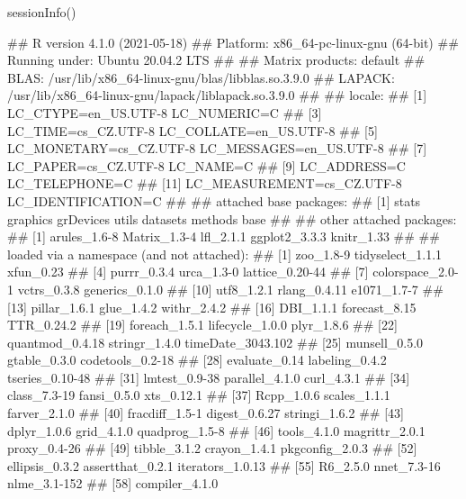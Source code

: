 \documentclass{article}\usepackage[]{graphicx}\usepackage[]{color}
\begin{document}
\begin{Schunk}
\begin{Sinput}
sessionInfo()
\end{Sinput}
\begin{Soutput}
## R version 4.1.0 (2021-05-18)
## Platform: x86_64-pc-linux-gnu (64-bit)
## Running under: Ubuntu 20.04.2 LTS
## 
## Matrix products: default
## BLAS:   /usr/lib/x86_64-linux-gnu/blas/libblas.so.3.9.0
## LAPACK: /usr/lib/x86_64-linux-gnu/lapack/liblapack.so.3.9.0
## 
## locale:
##  [1] LC_CTYPE=en_US.UTF-8       LC_NUMERIC=C              
##  [3] LC_TIME=cs_CZ.UTF-8        LC_COLLATE=en_US.UTF-8    
##  [5] LC_MONETARY=cs_CZ.UTF-8    LC_MESSAGES=en_US.UTF-8   
##  [7] LC_PAPER=cs_CZ.UTF-8       LC_NAME=C                 
##  [9] LC_ADDRESS=C               LC_TELEPHONE=C            
## [11] LC_MEASUREMENT=cs_CZ.UTF-8 LC_IDENTIFICATION=C       
## 
## attached base packages:
## [1] stats     graphics  grDevices utils     datasets  methods   base     
## 
## other attached packages:
## [1] arules_1.6-8  Matrix_1.3-4  lfl_2.1.1     ggplot2_3.3.3 knitr_1.33   
## 
## loaded via a namespace (and not attached):
##  [1] zoo_1.8-9         tidyselect_1.1.1  xfun_0.23        
##  [4] purrr_0.3.4       urca_1.3-0        lattice_0.20-44  
##  [7] colorspace_2.0-1  vctrs_0.3.8       generics_0.1.0   
## [10] utf8_1.2.1        rlang_0.4.11      e1071_1.7-7      
## [13] pillar_1.6.1      glue_1.4.2        withr_2.4.2      
## [16] DBI_1.1.1         forecast_8.15     TTR_0.24.2       
## [19] foreach_1.5.1     lifecycle_1.0.0   plyr_1.8.6       
## [22] quantmod_0.4.18   stringr_1.4.0     timeDate_3043.102
## [25] munsell_0.5.0     gtable_0.3.0      codetools_0.2-18 
## [28] evaluate_0.14     labeling_0.4.2    tseries_0.10-48  
## [31] lmtest_0.9-38     parallel_4.1.0    curl_4.3.1       
## [34] class_7.3-19      fansi_0.5.0       xts_0.12.1       
## [37] Rcpp_1.0.6        scales_1.1.1      farver_2.1.0     
## [40] fracdiff_1.5-1    digest_0.6.27     stringi_1.6.2    
## [43] dplyr_1.0.6       grid_4.1.0        quadprog_1.5-8   
## [46] tools_4.1.0       magrittr_2.0.1    proxy_0.4-26     
## [49] tibble_3.1.2      crayon_1.4.1      pkgconfig_2.0.3  
## [52] ellipsis_0.3.2    assertthat_0.2.1  iterators_1.0.13 
## [55] R6_2.5.0          nnet_7.3-16       nlme_3.1-152     
## [58] compiler_4.1.0
\end{Soutput}
\end{Schunk}
\end{document}
